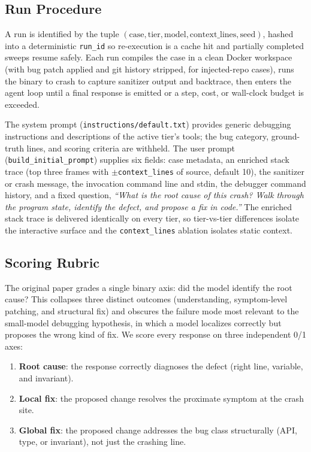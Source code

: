 \documentclass[11pt]{article}
\begin{document}
\subsection{Run Procedure}
\label{sec:methods:loop}

A run is identified by the tuple $(\text{case}, \text{tier}, \text{model}, \text{context\_lines}, \text{seed})$, hashed into a deterministic \texttt{run\_id} so re-execution is a cache hit and partially completed sweeps resume safely. Each run compiles the case in a clean Docker workspace (with bug patch applied and git history stripped, for injected-repo cases), runs the binary to crash to capture sanitizer output and backtrace, then enters the agent loop until a final response is emitted or a step, cost, or wall-clock budget is exceeded.

The system prompt (\texttt{instructions/default.txt}) provides generic debugging instructions and descriptions of the active tier's tools; the bug category, ground-truth lines, and scoring criteria are withheld. The user prompt (\texttt{build\_initial\_prompt}) supplies six fields: case metadata, an enriched stack trace (top three frames with $\pm$\texttt{context\_lines} of source, default 10), the sanitizer or crash message, the invocation command line and stdin, the debugger command history, and a fixed question, \emph{``What is the root cause of this crash? Walk through the program state, identify the defect, and propose a fix in code.''} The enriched stack trace is delivered identically on every tier, so tier-vs-tier differences isolate the interactive surface and the \texttt{context\_lines} ablation isolates static context.

\subsection{Scoring Rubric}
\label{sec:methods:rubric}

The original paper grades a single binary axis: did the model identify the root cause? This collapses three distinct outcomes (understanding, symptom-level patching, and structural fix) and obscures the failure mode most relevant to the small-model debugging hypothesis, in which a model localizes correctly but proposes the wrong kind of fix. We score every response on three independent 0/1 axes:

\begin{enumerate}
    \item \textbf{Root cause}: the response correctly diagnoses the defect (right line, variable, and invariant).
    \item \textbf{Local fix}: the proposed change resolves the proximate symptom at the crash site.
    \item \textbf{Global fix}: the proposed change addresses the bug class structurally (API, type, or invariant), not just the crashing line.
\end{enumerate}
\end{document}
